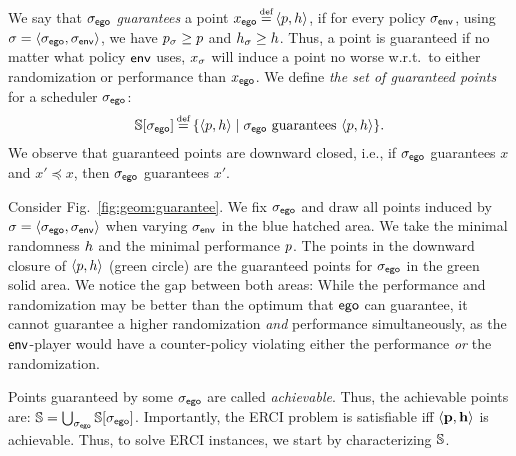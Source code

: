 We say that ${\sigma_{\mathsf{ego}}}$ \emph{guarantees} a point $x_\pOne \eqdef
\langle \scp, \rndp \rangle$, if for every policy ${\sigma_{\mathsf{env}}}$, using
$\sigma = \langle {\sigma_{\mathsf{ego}}}, {\sigma_{\mathsf{env}}} \rangle$, we have
$p_\sigma \geq p$ and $h_\sigma \geq h$. Thus, a point
is guaranteed if no matter what policy $\mathsf{env}$ uses, $x_\sigma$ will
induce a point no worse w.r.t.\ to either randomization or performance
than $x_{\mathsf{ego}}$. 
We define
\emph{the set of guaranteed points} for a scheduler ${\sigma_{\mathsf{ego}}}$:
\begin{equation}\label{eq:guaranteed}
  \solutions[\pOneSched] \eqdef \{ \langle \scp, \rndp \rangle \mid  \pOneSched \text{ guarantees } \langle \scp, \rndp \rangle \}.
\end{equation}
We observe that guaranteed points are
downward closed, i.e., if ${\sigma_{\mathsf{ego}}}$ guarantees $x$ and $x' \preceq x$,
then ${\sigma_{\mathsf{ego}}}$ guarantees $x'$.
\begin{example}
Consider Fig.~\ref{fig:geom:guarantee}. We fix ${\sigma_{\mathsf{ego}}}$ and draw all points induced by $\sigma = \langle {\sigma_{\mathsf{ego}}}, {\sigma_{\mathsf{env}}} \rangle$ when varying ${\sigma_{\mathsf{env}}}$ in the blue hatched area. We take the minimal randomness $h$ and the minimal performance $p$. The points in the downward closure  of $\langle p, h \rangle$ (green circle) are the guaranteed points for ${\sigma_{\mathsf{ego}}}$ in the green solid area.	
We notice the gap between both areas: While the performance and randomization may be better than the optimum that $\mathsf{ego}$ can guarantee, it cannot guarantee a higher randomization \emph{and} performance simultaneously, as  the $\mathsf{env}$-player would have a counter-policy violating either the performance \emph{or} the randomization.
\end{example}

Points guaranteed by some ${\sigma_{\mathsf{ego}}}$ are called
\emph{achievable}. Thus, the achievable points are: $ \mathbb{S} =
\bigcup_{{\sigma_{\mathsf{ego}}}} \mathbb{S}[{\sigma_{\mathsf{ego}}}]$.  Importantly, the ERCI problem is satisfiable iff $\langle \mathbf{p},
\mathbf{h} \rangle$ is achievable. 
Thus, to solve ERCI instances, we start by characterizing
$\mathbb{S}$.


